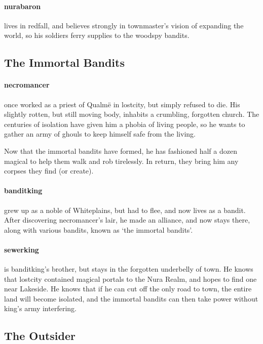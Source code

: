 \begin{multicols}{2}
\paragraph{\Gls{nurabaron}}
lives in \gls{redfall}, and believes strongly in \gls{townmaster}'s vision of expanding the world, so his soldiers ferry supplies to the woodspy bandits.

\subsection{The Immortal Bandits}

\paragraph{\Gls{necromancer}}
once worked as a priest of Qualm\"e in \gls{lostcity}, but simply refused to die.
His slightly rotten, but still moving body, inhabits a crumbling, forgotten church.
The centuries of isolation have given him a phobia of living people, so he wants to gather an army of ghouls to keep himself safe from the living.

Now that the immortal bandits have formed, he has fashioned half a dozen magical to help them walk and rob tirelessly.
In return, they bring him any corpses they find (or create).

\paragraph{\gls{banditking}}
grew up as a noble of Whiteplains, but had to flee, and now lives as a bandit.
After discovering \gls{necromancer}'s lair, he made an alliance, and now stays there, along with various bandits, known as `the immortal bandits'.

\paragraph{\gls{sewerking}}
is \gls{banditking}'s brother, but stays in the forgotten underbelly of \gls{town}.
He knows that \gls{lostcity} contained magical portals to the Nura Realm, and hopes to find one near Lakeside.
He knows that if he can cut off the only road to \gls{town}, the entire land will become isolated, and the immortal bandits can then take power without \gls{king}'s army interfering.

\subsection{The Outsider}


\end{multicols}
